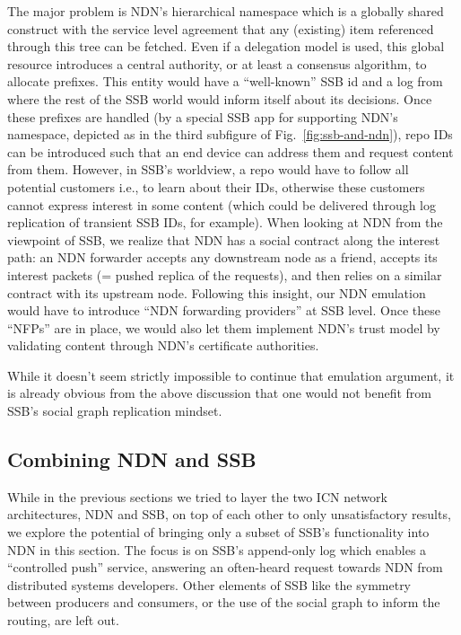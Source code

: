 \documentclass[9pt,sigconf]{acmart}
\begin{document}
The major problem is NDN's hierarchical namespace which is a globally
shared construct with the service level agreement that any (existing)
item referenced through this tree can be fetched.  Even if a
delegation model is used, this global resource introduces a central
authority, or at least a consensus algorithm, to allocate
prefixes. This entity would have a ``well-known'' SSB id and a log
from where the rest of the SSB world would inform itself about its
decisions. Once these prefixes are handled (by a special SSB app for
supporting NDN's namespace, depicted as  in the third subfigure of Fig.~\ref{fig:ssb-and-ndn}), repo IDs
can be introduced such that an end device can address them and request
content from them. However, in SSB's worldview, a repo would have to
follow all potential customers i.e., to learn about their IDs,
otherwise these customers cannot express interest in some content
(which could be delivered through log replication of transient SSB
IDs, for example). When looking at NDN from the viewpoint of SSB,
 we realize that NDN has a social contract along the interest path:
 an NDN forwarder accepts any downstream node as a friend, accepts its interest packets (= pushed
replica of the requests), and then relies on a similar contract with
its upstream node. Following this insight, our NDN emulation would
have to introduce ``NDN forwarding providers'' at SSB level. Once
these ``NFPs'' are in place, we would also let them implement
NDN's trust model by validating content through NDN's certificate
authorities.

While it doesn't seem strictly impossible to continue that emulation
argument, it is already obvious from the above discussion that one
would not benefit from SSB's social graph replication mindset.


\subsection{Combining NDN and SSB}
\label{ssect:combining}


While in the previous sections we tried to layer the two ICN network
architectures, NDN and SSB, on top of each other to only
unsatisfactory results, we explore the potential of bringing only a
subset of SSB's functionality into NDN in this section. The focus is
on SSB's append-only log which enables a ``controlled push''
service, answering an often-heard request towards NDN from
distributed systems developers. Other elements of SSB like the
symmetry between producers and consumers, or the use of the social
graph to inform the routing, are left out.
\end{document}
